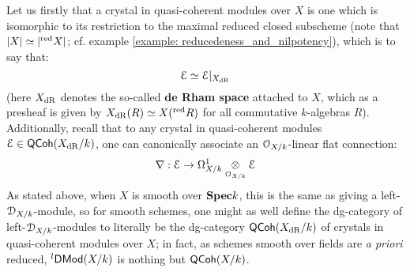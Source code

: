 \begin{enumerate}
                Let us firstly that a crystal in quasi-coherent modules over $X$ is one which is isomorphic to its restriction to the maximal reduced closed subscheme (note that $|X| \simeq |{}^{\mathrm{red}}X|$; cf. example \ref{example: reducedeness_and_nilpotency}), which is to say that:
                    $$\mathcal{E} \simeq \mathcal{E}|_{X_{\mathrm{dR}}}$$
                (here $X_{\mathrm{dR}}$ denotes the so-called \textbf{de Rham space} attached to $X$, which as a presheaf is given by $X_{\mathrm{dR}}(R) \simeq X({}^{\mathrm{red}}R)$ for all commutative $k$-algebras $R$). Additionally, recall that to any crystal in quasi-coherent modules $\mathcal{E} \in \mathsf{QCoh}(X_{\mathrm{dR}}/k)$, one can canonically associate an $\mathcal{O}_{X/k}$-linear flat connection:
                    $$\nabla: \E \to \Omega^1_{X/k} \tensor_{\calO_{X/k}} \E$$
                As stated above, when $X$ is smooth over $\mathbf{Spec} k$, this is the same as giving a left-$\mathcal{D}_{X/k}$-module, so for smooth schemes, one might as well define the dg-category of left-$\mathcal{D}_{X/k}$-modules to literally be the dg-category $\mathsf{QCoh}(X_{\mathrm{dR}}/k)$ of crystals in quasi-coherent modules over $X$; in fact, as schemes smooth over fields are \textit{a priori} reduced, ${}^l\mathsf{DMod}(X/k)$ is nothing but $\mathsf{QCoh}(X/k)$.
                

\end{enumerate}

